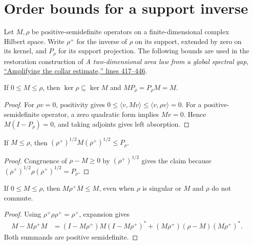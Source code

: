 \section{Order bounds for a support inverse}
\label{sec:support_inverse_sandwich}

Let $M,\rho$ be positive-semidefinite operators on a finite-dimensional
complex Hilbert space. Write $\rho^+$ for the inverse of $\rho$ on its
support, extended by zero on its kernel, and $P_\rho$ for its support
projection. The following bounds are used in the restoration construction
of \emph{A two-dimensional area law from a global spectral gap},
\href{https://github.com/openai/math/blob/adc7f1241b42e322a6451854ab7e4b4c146bf78a/preprints/A-two-dimensional-area-law-from-a-global-spectral-gap-September-24-2026/build/sections/09-amplification.tex\#L417-L446}{``Amplifying the collar estimate,'' lines 417--446}.

\begin{theorem}
\label{thm:support_inverse_kernel}
\leanok
If $0\le M\le\rho$, then $\ker\rho\subseteq\ker M$ and
$MP_\rho=P_\rho M=M$.
\end{theorem}
\begin{proof}
\leanok
For $\rho v=0$, positivity gives
$0\le\langle v,Mv\rangle\le\langle v,\rho v\rangle=0$.
For a positive-semidefinite operator, a zero quadratic form implies
$Mv=0$. Hence $M(I-P_\rho)=0$, and taking adjoints gives left absorption.
\end{proof}

\begin{theorem}
\label{thm:support_inverse_normalization}
\leanok
If $M\le\rho$, then $(\rho^+)^{1/2}M(\rho^+)^{1/2}\le P_\rho$.
\end{theorem}
\begin{proof}
\leanok
Congruence of $\rho-M\ge0$ by $(\rho^+)^{1/2}$ gives the claim because
$(\rho^+)^{1/2}\rho(\rho^+)^{1/2}=P_\rho$.
\end{proof}

\begin{theorem}
\label{thm:support_inverse_sandwich}
\leanok
If $0\le M\le\rho$, then $M\rho^+M\le M$, even when $\rho$ is singular
or $M$ and $\rho$ do not commute.
\end{theorem}
\begin{proof}
\leanok
Using $\rho^+\rho\rho^+=\rho^+$, expansion gives
\begin{align*}
M-M\rho^+M
&=(I-M\rho^+)M(I-M\rho^+)^*
  +(M\rho^+)(\rho-M)(M\rho^+)^*.
\end{align*}
Both summands are positive semidefinite.
\end{proof}
